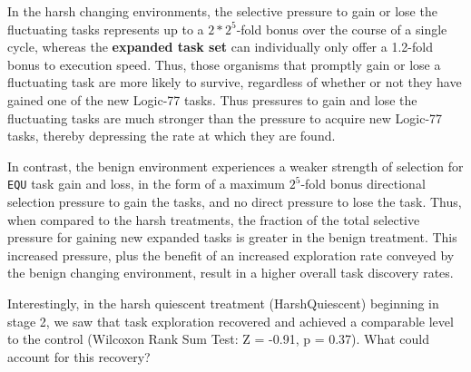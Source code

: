 \documentclass[10pt,letterpaper]{article}
\begin{document}
In the harsh changing environments, the selective pressure to gain or lose the fluctuating tasks represents up to a $2 * 2^5$-fold bonus over the course of a single cycle, whereas the \textbf{expanded task set} can individually only offer a 1.2-fold bonus to execution speed. Thus, those organisms that promptly gain or lose a fluctuating task are more likely to survive, regardless of whether or not they have gained one of the new Logic-77 tasks. Thus pressures to gain and lose the fluctuating tasks are much stronger than the pressure to acquire new Logic-77 tasks, thereby depressing the rate at which they are found.

In contrast, the benign environment experiences a weaker strength of selection for \texttt{EQU} task gain and loss, in the form of a maximum $2^5$-fold bonus directional selection pressure to gain the tasks, and no direct pressure to lose the task. Thus, when compared to the harsh treatments, the fraction of the total selective pressure for gaining new expanded tasks is greater in the benign treatment. This increased pressure, plus the benefit of an increased exploration rate conveyed by the benign changing environment, result in a higher overall task discovery rates.

Interestingly, in the harsh quiescent treatment (HarshQuiescent) beginning in stage 2, we saw that task exploration recovered and achieved a comparable level to the control (Wilcoxon Rank Sum Test: Z = -0.91, p = 0.37). What could account for this recovery? 
\end{document}
